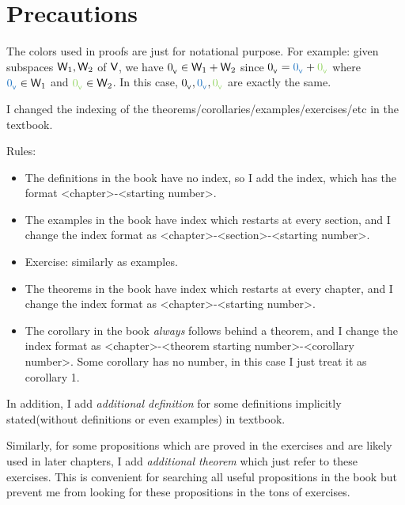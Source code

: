 \setcounter{chapter}{-1}
\chapter{Precautions}

\begin{note}
The colors used in proofs are just for notational purpose.
For example: given subspaces \(\textsf{W}_1, \textsf{W}_2\) of \(\textsf{V}\), we have \(0_{_{\textsf{V}}} \in \textsf{W}_1 + \textsf{W}_2\) since \(\OV = \BLUE{\OV} + \GREEN{\OV}\) where \(\BLUE{\OV} \in \W_1\) and \(\GREEN{\OV} \in \W_2\).
In this case, \(\OV, \BLUE{\OV}, \GREEN{\OV}\) are exactly the same.
\end{note}

\begin{note}
I changed the indexing of the theorems/corollaries/examples/exercises/etc in the textbook.

Rules:
\begin{itemize}
\item The definitions in the book have no index, so I add the index, which has the format <chapter>-<starting number>.
\item The examples in the book have index which restarts at every section, and I change the index format as <chapter>-<section>-<starting number>.
\item Exercise: similarly as examples.
\item The theorems in the book have index which restarts at every chapter, and I change the index format as <chapter>-<starting number>.
\item The corollary in the book \emph{always} follows behind a theorem, and I change the index format as <chapter>-<theorem starting number>-<corollary number>.
    Some corollary has no number, in this case I just treat it as corollary 1.
\end{itemize}

In addition, I add \emph{additional definition} for some definitions implicitly stated(without definitions or even examples) in textbook.

Similarly, for some propositions which are proved in the exercises and are likely used in later chapters, I add \emph{additional theorem} which just refer to these exercises.
This is convenient for searching all useful propositions in the book but prevent me from looking for these propositions in the tons of exercises.
\end{note}
